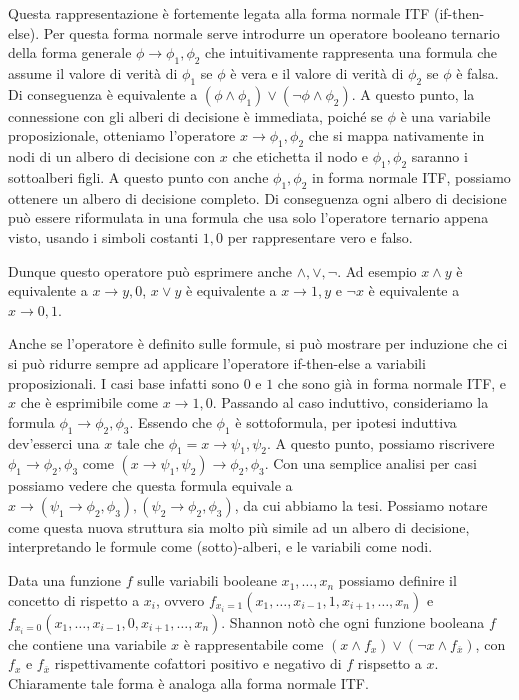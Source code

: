 Questa rappresentazione è fortemente legata alla forma normale ITF (if-then-else). Per questa forma normale serve introdurre un operatore booleano ternario della forma generale \(\phi \to \phi_1,\phi_2\) che intuitivamente rappresenta una formula che assume il valore di verità di \(\phi_1\) se \(\phi\) è vera e il valore di verità di \(\phi_2\) se \(\phi\) è falsa. Di conseguenza è equivalente a \((\phi \land \phi_1) \lor (\neg \phi \land \phi_2)\). A questo punto, la connessione con gli alberi di decisione è immediata, poiché se \(\phi\) è una variabile proposizionale, otteniamo l'operatore \(x\to \phi_1,\phi_2\) che si mappa nativamente in nodi di un albero di decisione con \(x\) che etichetta il nodo e \(\phi_1,\phi_2\) saranno i sottoalberi figli. A questo punto con anche \(\phi_1,\phi_2\) in forma normale ITF, possiamo ottenere un albero di decisione completo. Di conseguenza ogni albero di decisione può essere riformulata in una formula che usa solo l'operatore ternario appena visto, usando i simboli costanti \(1,0\) per rappresentare vero e falso.

Dunque questo operatore può esprimere anche \(\land,\lor, \neg\). Ad esempio \(x \land y\) è equivalente a \(x \to y,0\), \(x \lor y\) è equivalente a \(x \to 1,y\) e \(\neg x\) è equivalente a \(x \to 0,1\).

Anche se l'operatore è definito sulle formule, si può mostrare per induzione che ci si può ridurre sempre ad applicare l'operatore if-then-else a variabili proposizionali. I casi base infatti sono \(0\) e \(1\) che sono già in forma normale ITF\@, e \(x\) che è esprimibile come \(x\to 1,0\). Passando al caso induttivo, consideriamo la formula \(\phi_1 \to \phi_2,\phi_3\). Essendo che \(\phi_1\) è sottoformula, per ipotesi induttiva dev'esserci una \(x\) tale che \(\phi_1 = x \to \psi_1,\psi_2\). A questo punto, possiamo riscrivere \(\phi_1 \to \phi_2,\phi_3\) come \((x \to \psi_1,\psi_2) \to \phi_2,\phi_3\). Con una semplice analisi per casi possiamo vedere che questa formula equivale a \(x\to(\psi_1\to\phi_2,\phi_3),(\psi_2\to\phi_2,\phi_3)\), da cui abbiamo la tesi. Possiamo notare come questa nuova struttura sia molto più simile ad un albero di decisione, interpretando le formule come (sotto)-alberi, e le variabili come nodi.

Data una funzione \(f\) sulle variabili booleane \(x_1,\dots,x_n\) possiamo definire il concetto di  rispetto a \(x_i\), ovvero \(f_{x_i = 1}(x_1, \ldots, x_{i-1}, 1, x_{i+1}, \ldots, x_n)\) e \(f_{x_i = 0}(x_1, \ldots, x_{i-1}, 0, x_{i+1}, \ldots, x_n)\). Shannon notò che ogni funzione booleana \(f\) che contiene una variabile \(x\) è rappresentabile come \((x\land f_x) \lor (\neg x \land f_{\overline{x}})\), con \(f_x\) e \(f_{\overline{x}}\) rispettivamente cofattori positivo e negativo di \(f\) rispsetto a \(x\). Chiaramente tale forma è analoga alla forma normale ITF.

